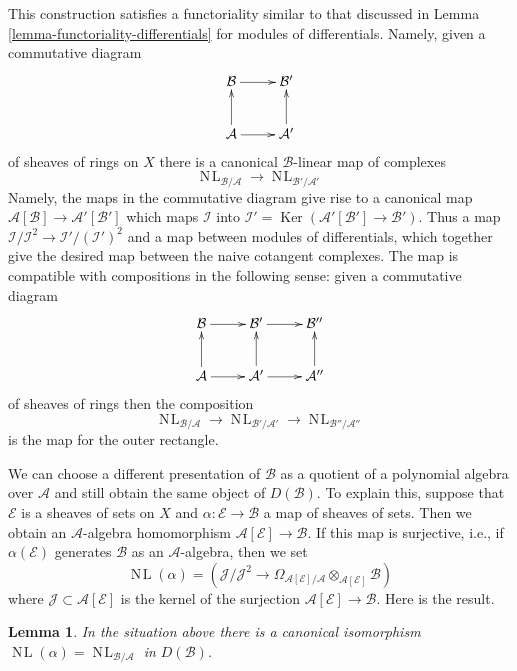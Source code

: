 \documentclass{stacks-project}
\theoremstyle{plain}
\newtheorem{lemma}[subsection]{Lemma}
\theoremstyle{definition}
\theoremstyle{remark}
\numberwithin{equation}{subsection}
\def\NL{\mathop{N\!L}\nolimits}
\def\Ker{\mathop{\mathrm{Ker}}}
\begin{document}
\noindent
This construction satisfies a functoriality similar to that discussed
in Lemma \ref{lemma-functoriality-differentials} for modules of differentials.
Namely, given a commutative diagram
\begin{equation}
\label{equation-commutative-square-sheaves}
\vcenter{
\xymatrix{
\mathcal{B} \ar[r] & \mathcal{B}' \\
\mathcal{A} \ar[u] \ar[r] & \mathcal{A}' \ar[u]
}
}
\end{equation}
of sheaves of rings on $X$ there is a canonical
$\mathcal{B}$-linear map of complexes
$$
\NL_{\mathcal{B}/\mathcal{A}} \longrightarrow \NL_{\mathcal{B}'/\mathcal{A}'}
$$
Namely, the maps in the commutative diagram give rise to a canonical map
$\mathcal{A}[\mathcal{B}] \to \mathcal{A}'[\mathcal{B}']$
which maps $\mathcal{I}$ into
$\mathcal{I}' = \Ker(\mathcal{A}'[\mathcal{B}'] \to \mathcal{B}')$.
Thus a map $\mathcal{I}/\mathcal{I}^2 \to \mathcal{I}'/(\mathcal{I}')^2$
and a map between modules of differentials, which together give the
desired map between the naive cotangent complexes.
The map is compatible with compositions in the following sense:
given a commutative diagram
$$
\xymatrix{
\mathcal{B} \ar[r] &
\mathcal{B}' \ar[r] &
\mathcal{B}'' \\
\mathcal{A} \ar[u] \ar[r] &
\mathcal{A}' \ar[u] \ar[r] &
\mathcal{A}'' \ar[u]
}
$$
of sheaves of rings then the composition
$$
\NL_{\mathcal{B}/\mathcal{A}} \longrightarrow
\NL_{\mathcal{B}'/\mathcal{A}'} \longrightarrow
\NL_{\mathcal{B}''/\mathcal{A}''}
$$
is the map for the outer rectangle.

\medskip\noindent
We can choose a different presentation of $\mathcal{B}$ as a quotient of a
polynomial algebra over $\mathcal{A}$ and still obtain the same object
of $D(\mathcal{B})$. To explain this, suppose that $\mathcal{E}$ is
a sheaves of sets on $X$ and $\alpha : \mathcal{E} \to \mathcal{B}$
a map of sheaves of sets. Then we obtain an $\mathcal{A}$-algebra
homomorphism $\mathcal{A}[\mathcal{E}] \to \mathcal{B}$. If this map
is surjective, i.e., if $\alpha(\mathcal{E})$ generates $\mathcal{B}$
as an $\mathcal{A}$-algebra, then we set
$$
\NL(\alpha) = \left(
\mathcal{J}/\mathcal{J}^2
\longrightarrow
\Omega_{\mathcal{A}[\mathcal{E}]/\mathcal{A}}
\otimes_{\mathcal{A}[\mathcal{E}]} \mathcal{B}\right)
$$
where $\mathcal{J} \subset \mathcal{A}[\mathcal{E}]$ is the kernel
of the surjection $\mathcal{A}[\mathcal{E}] \to \mathcal{B}$.
Here is the result.

\begin{lemma}
\label{lemma-NL-up-to-qis}
In the situation above there is a canonical isomorphism
$\NL(\alpha) = \NL_{\mathcal{B}/\mathcal{A}}$ in $D(\mathcal{B})$.
\end{lemma}
\end{document}
